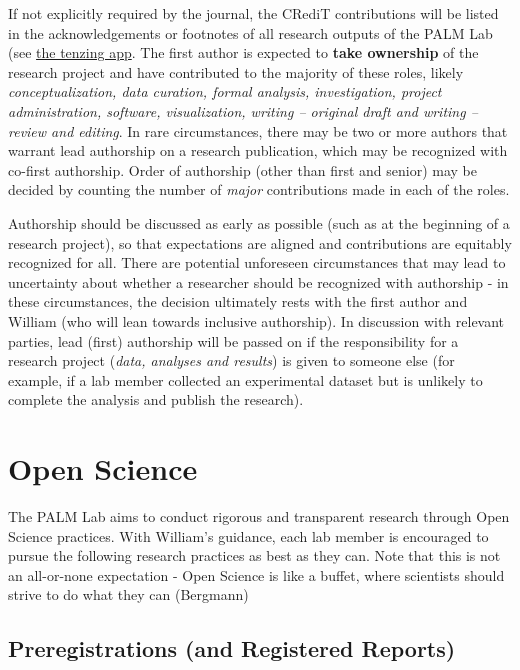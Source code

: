 \documentclass[
]{book}
\begin{document}
If not explicitly required by the journal, the CRediT contributions will be listed in the acknowledgements or footnotes of all research outputs of the PALM Lab (see \protect\hyperlink{tenzing}{the tenzing app}. The first author is expected to \textbf{take ownership} of the research project and have contributed to the majority of these roles, likely \emph{conceptualization, data curation, formal analysis, investigation, project administration, software, visualization, writing -- original draft and writing -- review and editing}. In rare circumstances, there may be two or more authors that warrant lead authorship on a research publication, which may be recognized with co-first authorship. Order of authorship (other than first and senior) may be decided by counting the number of \emph{major} contributions made in each of the roles.

Authorship should be discussed as early as possible (such as at the beginning of a research project), so that expectations are aligned and contributions are equitably recognized for all. There are potential unforeseen circumstances that may lead to uncertainty about whether a researcher should be recognized with authorship - in these circumstances, the decision ultimately rests with the first author and William (who will lean towards inclusive authorship). In discussion with relevant parties, lead (first) authorship will be passed on if the responsibility for a research project (\emph{data, analyses and results}) is given to someone else (for example, if a lab member collected an experimental dataset but is unlikely to complete the analysis and publish the research).

\hypertarget{open-science}{%
\section{Open Science}\label{open-science}}

The PALM Lab aims to conduct rigorous and transparent research through Open Science practices. With William's guidance, each lab member is encouraged to pursue the following research practices as best as they can. Note that this is not an all-or-none expectation - Open Science is like a buffet, where scientists should strive to do what they can (Bergmann)

\hypertarget{preregistrations-and-registered-reports}{%
\subsection{Preregistrations (and Registered Reports)}\label{preregistrations-and-registered-reports}}
\end{document}
